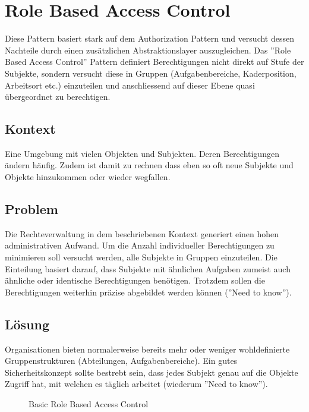 \section{Role Based Access Control}

Diese Pattern basiert stark auf dem Authorization Pattern und versucht dessen Nachteile durch einen zusätzlichen Abstraktionslayer auszugleichen.
Das ''Role Based Access Control'' Pattern definiert Berechtigungen nicht direkt auf Stufe der Subjekte, sondern versucht diese in Gruppen (Aufgabenbereiche, Kaderposition, Arbeitsort etc.) einzuteilen und anschliessend auf dieser Ebene quasi übergeordnet zu berechtigen.

\subsection*{Kontext}
Eine Umgebung mit vielen Objekten und Subjekten. Deren Berechtigungen ändern häufig. Zudem ist damit zu rechnen dass eben so oft neue Subjekte und Objekte hinzukommen oder wieder wegfallen.

\subsection*{Problem}
Die Rechteverwaltung in dem beschriebenen Kontext generiert einen hohen administrativen Aufwand. Um die Anzahl individueller Berechtigungen zu minimieren soll versucht werden, alle Subjekte in Gruppen einzuteilen. Die Einteilung basiert darauf, dass Subjekte mit ähnlichen Aufgaben zumeist auch ähnliche oder identische Berechtigungen benötigen.
Trotzdem sollen die Berechtigungen weiterhin präzise abgebildet werden können (''Need to know'').

\subsection*{Lösung}
Organisationen bieten normalerweise bereits mehr oder weniger wohldefinierte Gruppenstrukturen (Abteilungen, Aufgabenbereiche).
Ein gutes Sicherheitskonzept sollte bestrebt sein, dass jedes Subjekt genau auf die Objekte Zugriff hat, mit welchen es täglich arbeitet (wiederum ''Need to know'').

\begin{figure}[H]
	\begin{center}
	\end{center}
	\caption{Basic Role Based Access Control}
\end{figure}

